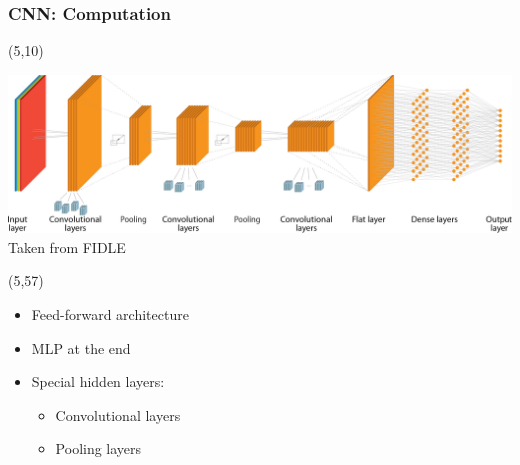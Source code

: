 \begin{frame}
  \frametitle{\acl{CNN}: Computation}
  \hypertarget<4>{CNN_Overview_Convolutional}{}
  \hypertarget<5>{CNN_Overview_Pooling}{}

  \begin{textblock}{90}(5,10)
    \begin{center}
      \includegraphics[width=\textwidth]{img/CNN.png}
      Taken from FIDLE
    \end{center}
  \end{textblock}

  \begin{textblock}{45}(5,57)
    \begin{itemize}
    \item Feed-forward architecture
    \item<2-> \ac{MLP} at the end
    \item<3-> Special hidden layers:
      \begin{itemize}
      \item Convolutional layers \hyperlink{Convolutional_Layers}{}
      \item Pooling layers \hyperlink{Pooling_Layers}{}
      \end{itemize}
    \end{itemize}
  \end{textblock}


\end{frame}

